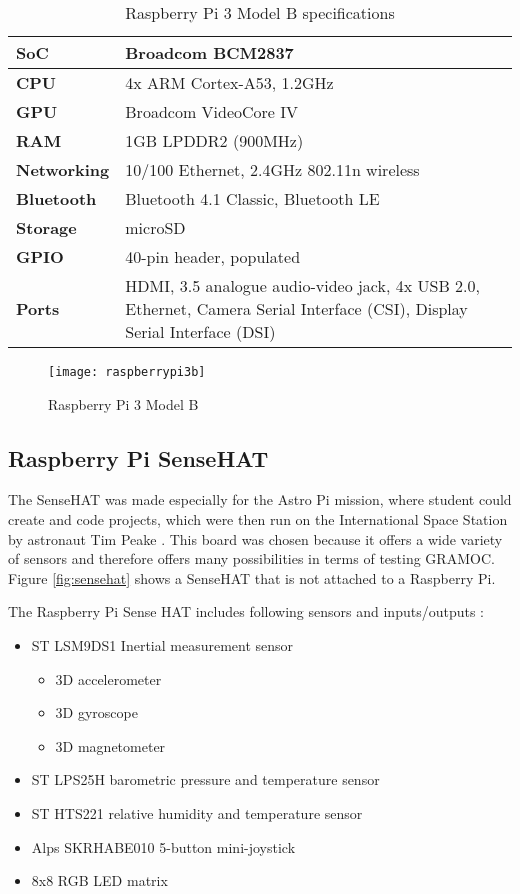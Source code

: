 \begin{table}[h]
    \centering
    \begin{tabularx}{\linewidth}{| l | X |}
    \hline
    \textbf{SoC} & Broadcom BCM2837 \\ \hline
    \textbf{CPU} & 4x ARM Cortex-A53, 1.2GHz \\ \hline
    \textbf{GPU} & Broadcom VideoCore IV \\ \hline
    \textbf{RAM} & 1GB LPDDR2 (900MHz) \\ \hline
    \textbf{Networking} & 10/100 Ethernet, 2.4GHz 802.11n wireless \\ \hline
    \textbf{Bluetooth} & Bluetooth 4.1 Classic, Bluetooth LE \\ \hline
    \textbf{Storage} & microSD \\ \hline
    \textbf{GPIO} & 40-pin header, populated \\ \hline
    \textbf{Ports} & HDMI, 3.5 analogue audio-video jack, 4x USB 2.0, Ethernet, Camera Serial Interface (CSI), Display Serial Interface (DSI) \\ \hline
    \end{tabularx}
    \caption{Raspberry Pi 3 Model B specifications}
    \label{tab:raspispec}
\end{table}

\begin{figure}[H]
	\centering
	\texttt{[image: raspberrypi3b]}
	\caption{Raspberry Pi 3 Model B \autocite{img:raspi}}
	\label{fig:raspberrypi3b}
\end{figure}

\subsection{Raspberry Pi SenseHAT}

The SenseHAT was made especially for the Astro Pi mission, where student could create and code projects, which were then run on the International Space Station by astronaut Tim Peake \autocite{AstroPiMission}. This board was chosen because it offers a wide variety of sensors and therefore offers many possibilities in terms of testing GRAMOC. Figure \vref{fig:sensehat} shows a SenseHAT that is not attached to a Raspberry Pi.

The Raspberry Pi Sense HAT includes following sensors and inputs/outputs \autocite{SenseHAT}:

\begin{itemize}
	\item ST LSM9DS1 Inertial measurement sensor
		\begin{itemize}
			\item 3D accelerometer
			\item 3D gyroscope
			\item 3D magnetometer
		\end{itemize}
	\item ST LPS25H barometric pressure and temperature sensor
	\item ST HTS221 relative humidity and temperature sensor
	\item Alps SKRHABE010 5-button mini-joystick
	\item 8x8 RGB LED matrix
\end{itemize}

